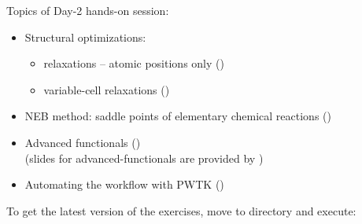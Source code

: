\documentclass[landscape]{foils}
\begin{document}
\blue

Topics of Day-2 hands-on session:
\begin{itemize}
\item Structural optimizations:
  \begin{itemize}
  \item relaxations -- atomic positions only ()
  \item variable-cell relaxations ()
  \end{itemize}
\item NEB method: saddle points of elementary chemical
  reactions ()
\item Advanced functionals ()\\
  (slides for advanced-functionals are provided by )
\item Automating the workflow with PWTK
  ()\\
\end{itemize}

To get the
latest version of the exercises, move to  directory and execute:\\[0.5em]

\rightheader{}
\end{document}
